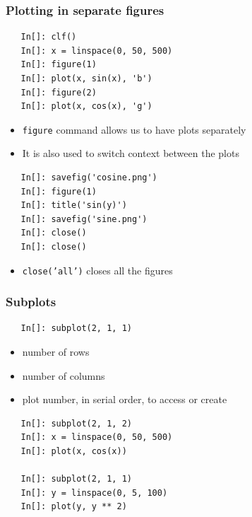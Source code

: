 \begin{frame}[fragile]
  \frametitle{Plotting in separate figures}
  \begin{lstlisting}
   In[]: clf()
   In[]: x = linspace(0, 50, 500)
   In[]: figure(1)
   In[]: plot(x, sin(x), 'b')
   In[]: figure(2)
   In[]: plot(x, cos(x), 'g')
  \end{lstlisting}
  \begin{itemize}
  \item \texttt{figure} command allows us to have plots separately
  \item It is also used to switch context between the plots
  \end{itemize}
  \begin{lstlisting}
   In[]: savefig('cosine.png')
   In[]: figure(1)
   In[]: title('sin(y)')
   In[]: savefig('sine.png')
   In[]: close()
   In[]: close()
  \end{lstlisting}
  \begin{itemize}
  \item \texttt{close('all')} closes all the figures
  \end{itemize}
\end{frame}

\begin{frame}[fragile]
  \frametitle{Subplots}
  \begin{lstlisting}
   In[]: subplot(2, 1, 1)
  \end{lstlisting}
  \begin{itemize}
  \item number of rows
  \item number of columns
  \item plot number, in serial order, to access or create
  \end{itemize}
  \begin{lstlisting}
   In[]: subplot(2, 1, 2)
   In[]: x = linspace(0, 50, 500)
   In[]: plot(x, cos(x))

   In[]: subplot(2, 1, 1)
   In[]: y = linspace(0, 5, 100)
   In[]: plot(y, y ** 2)
  \end{lstlisting}
\end{frame}

